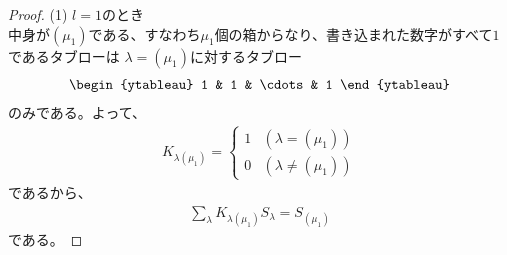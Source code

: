 \documentclass[a4paper,11pt]{jsarticle}
\theoremstyle{plain}
\theoremstyle{definition}
\renewcommand{\(}{\left(}
\renewcommand{\)}{\right)}
\renewcommand{\[}{\left[}
\renewcommand{\]}{\right]}
\renewcommand{\{}{\left\lbrace}
\renewcommand{\}}{\right\rbrace}
\begin{document}
\begin{proof}



    
    \subitem (1) $l=1$のとき \\
    中身が$(\mu_1)$である、すなわち$\mu_1$個の箱からなり、書き込まれた数字がすべて$1$であるタブローは
    $\lambda = (\mu_1)$に対するタブロー
    \begin{align*}
        \begin{ytableau}
            1 & 1 & \cdots & 1
        \end{ytableau}
    \end{align*}
    のみである。よって、
    \begin{align*}
        K_{\lambda (\mu_1)} = \begin{cases}
            1 & (\lambda = (\mu_1))\\
            0 & (\lambda \neq (\mu_1))
        \end{cases}
    \end{align*}
    であるから、
    \begin{align*}
        \sum_{\lambda} K_{\lambda (\mu_1)} S_{\lambda} = S_{(\mu_1)}
    \end{align*}
    である。


\end{proof}
\end{document}
